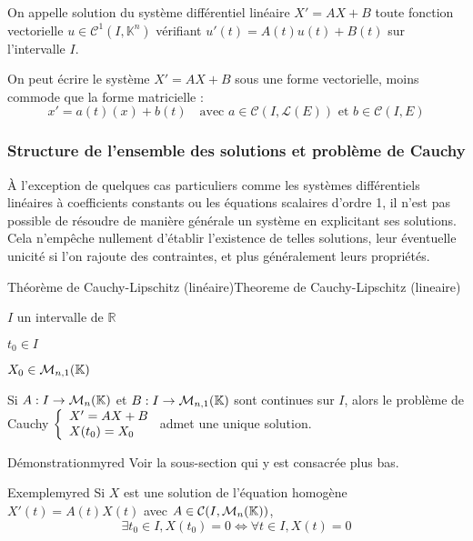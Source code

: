     On appelle solution du système différentiel linéaire $X' = AX + B$ toute fonction vectorielle $u \in \mathcal{C}^1 (I,\mathbb{K}^n)$ vérifiant $u'(t) = A(t) u(t) + B(t)$ sur l’intervalle $I$.

    On peut écrire le système $X' = AX + B$ sous une forme vectorielle, moins commode que la forme matricielle : 
    \[ x' = a(t)(x) + b(t) \quad \text{avec } a \in \mathcal{C}(I,\mathcal{L}(E)) \text{ et } b \in \mathcal{C}(I,E) \] 

    \subsubsection{Structure de l’ensemble des solutions et problème de Cauchy}

    À l’exception de quelques cas particuliers comme les systèmes différentiels linéaires à coefficients constants ou les équations scalaires d’ordre 1, il n’est pas possible de résoudre de manière générale un système en explicitant ses solutions. Cela n’empêche nullement d’établir l’existence de telles solutions, leur éventuelle unicité si l’on rajoute des contraintes, et plus généralement leurs propriétés.

    \begin{theo}{Théorème de Cauchy-Lipschitz (linéaire)}{Theoreme de Cauchy-Lipschitz (lineaire)}
        \begin{soient}
            \item $I$ un intervalle de $\mathbb{R}$
            \item $t_0 \in I$
            \item $X_0 \in \mathcal{M}_{n,1}(\mathbb{K})$
        \end{soient}
        Si $A: I \rightarrow \mathcal{M}_{n}(\mathbb{K})$ et $B : I \rightarrow \mathcal{M}_{n,1}(\mathbb{K})$ sont continues sur $I$, alors le problème de Cauchy $\et{X' = AX + B}{X(t_0) = X_0}$ admet une unique solution.
    \end{theo}

    \begin{demo}{Démonstration}{myred}
        Voir la sous-section qui y est consacrée plus bas.
    \end{demo}

    \begin{omed}{Exemple}{myred}
        Si $X$ est une solution de l’équation homogène $X'(t) = A(t)X(t)$ avec $A \in \mathcal{C}(I,\mathcal{M}_{n}(\mathbb{K}))$, 
        \[ \exists t_0 \in I, X(t_0) = 0 \iff \forall t \in I, X(t)=0 \]
    \end{omed}

